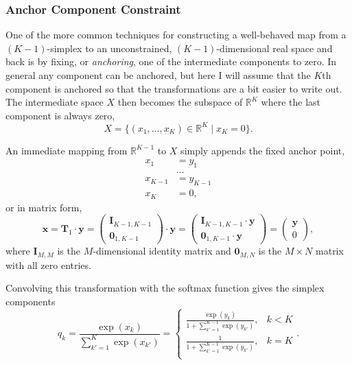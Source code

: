 \documentclass[
  letterpaper,
  DIV=11,
  numbers=noendperiod]{scrartcl}
\begin{document}
\subsubsection{Anchor Component
Constraint}\label{anchor-component-constraint}

One of the more common techniques for constructing a well-behaved map
from a \((K - 1)\)-simplex to an unconstrained, \((K - 1)\)-dimensional
real space and back is by fixing, or \emph{anchoring}, one of the
intermediate components to zero. In general any component can be
anchored, but here I will assume that the \(K\)th component is anchored
so that the transformations are a bit easier to write out. The
intermediate space \(X\) then becomes the subspace of \(\mathbb{R}^{K}\)
where the last component is always zero, \[
X = \{ (x_{1}, \ldots, x_{K}) \in \mathbb{R}^{K} \mid x_{K} = 0 \}.
\]

An immediate mapping from \(\mathbb{R}^{K - 1}\) to \(X\) simply appends
the fixed anchor point, \begin{align*}
x_{1} &= y_{1}
\\
& \ldots
\\
x_{K - 1} &= y_{K - 1}
\\
x_{K} &= 0,
\end{align*} or in matrix form, \[
\mathbf{x}
=
\mathbf{T}_{1} \cdot \mathbf{y}
=
\begin{pmatrix}
\mathbf{I}_{K - 1, K - 1} \\
\mathbf{0}_{1, K - 1}
\end{pmatrix}
\cdot
\mathbf{y}
=
\begin{pmatrix}
\mathbf{I}_{K - 1, K - 1} \cdot \mathbf{y} \\
\mathbf{0}_{1, K - 1} \cdot \mathbf{y}
\end{pmatrix}
=
\begin{pmatrix}
\mathbf{y} \\
0
\end{pmatrix},
\] where \(\mathbf{I}_{M, M}\) is the \(M\)-dimensional identity matrix
and \(\mathbf{0}_{M, N}\) is the \(M \times N\) matrix with all zero
entries.

Convolving this transformation with the softmax function gives the
simplex components \[
q_{k}
=
\frac{ \exp( x_{k} ) }{ \sum_{k' = 1}^{K} \exp( x_{k'} ) }
=
\left\{
\begin{array}{rr}
\frac{ \exp( y_{k} ) }{ 1 + \sum_{k' = 1}^{K - 1} \exp( y_{k'} ) }, & k < K \\
\frac{ 1 }{ 1 + \sum_{k' = 1}^{K - 1} \exp( y_{k'} ) },             & k = K \\
\end{array}
\right. .
\]
\end{document}
